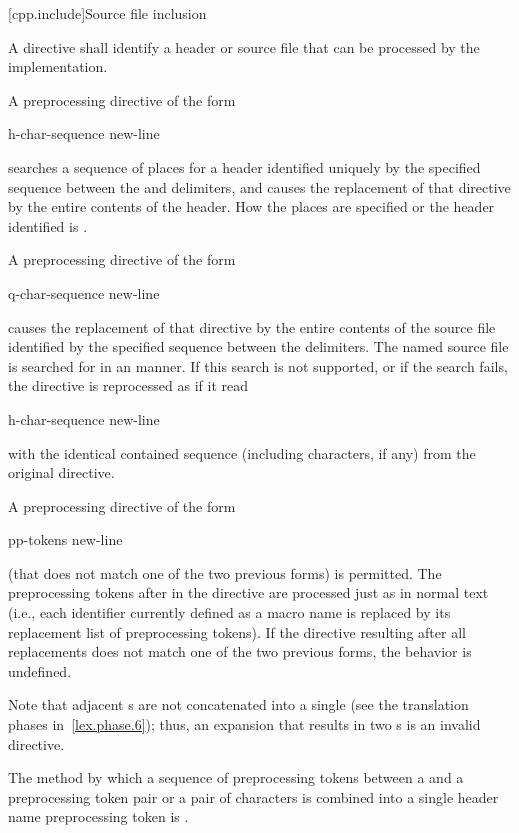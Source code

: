[cpp.include]{Source file inclusion}
%
%

\pnum
A
directive shall identify a header or source file
that can be processed by the implementation.

\pnum
A preprocessing directive of the form
\begin{ncsimplebnf}
 h-char-sequence \terminal{>} new-line
\end{ncsimplebnf}
searches a sequence of
places
for a header identified uniquely by the specified sequence
between the
\tcode{<}
and
\tcode{>}
delimiters,
and causes the replacement of that
directive by the entire contents of the header.
How the places are specified
or the header identified
is .

\pnum
A preprocessing directive of the form
\begin{ncsimplebnf}
 q-char-sequence  new-line
\end{ncsimplebnf}
causes the replacement of that
directive by the entire contents of the
source file identified by the specified sequence between the
delimiters.
The named source file is searched for in an
manner.
If this search is not supported,
or if the search fails,
the directive is reprocessed as if it read
\begin{ncsimplebnf}
 h-char-sequence \terminal{>} new-line
\end{ncsimplebnf}
with the identical contained sequence (including
\tcode{>}
characters, if any) from the original directive.

\pnum
A preprocessing directive of the form
\begin{ncsimplebnf}
 pp-tokens new-line
\end{ncsimplebnf}
(that does not match one of the two previous forms) is permitted.
The preprocessing tokens after
in the directive are processed just as in normal text
(i.e., each identifier currently defined as a macro name is replaced by its
replacement list of preprocessing tokens).
If the directive resulting after all replacements does not match
one of the two previous forms, the behavior is
undefined.
\begin{footnote}
Note that adjacent s are not concatenated into
a single 
(see the translation phases in~\ref{lex.phase.6});
thus, an expansion that results in two s is an
invalid directive.
\end{footnote}
The method by which a sequence of preprocessing tokens between a
\tcode{<}
and a
\tcode{>}
preprocessing token pair or a pair of
characters is combined into a single header name
preprocessing token is .

